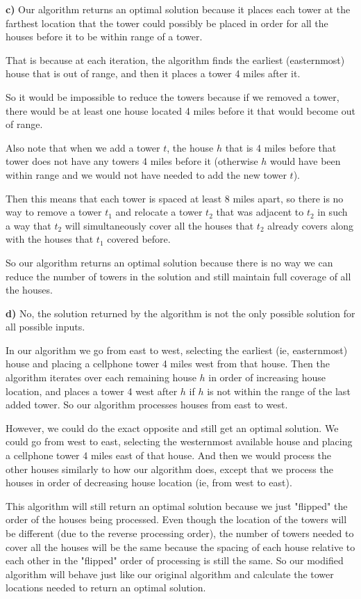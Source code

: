 \documentclass{article}
\begin{document}
\textbf{c)} Our algorithm returns an optimal solution because it places each tower at the farthest location that the tower could possibly be placed in order for all the houses before it to be within range of a tower.

That is because at each iteration, the algorithm finds the earliest (easternmost) house that is out of range, and then it places a tower 4 miles after it.

So it would be impossible to reduce the towers because if we removed a tower, there would be at least one house located 4 miles before it that would become out of range. 

Also note that when we add a tower $t$, the house $h$ that is 4 miles before that tower does not have any towers 4 miles before it (otherwise $h$ would have been within range and we would not have needed to add the new tower $t$).

Then this means that each tower is spaced at least 8 miles apart, so there is no way to remove a tower $t_1$ and relocate a tower $t_2$ that was adjacent to $t_2$ in such a way that $t_2$ will simultaneously cover all the houses that $t_2$ already covers along with the houses that $t_1$ covered before.

So our algorithm returns an optimal solution because there is no way we can reduce the number of towers in the solution and still maintain full coverage of all the houses.



\textbf{d)} No, the solution returned by the algorithm is not the only possible solution for all possible inputs.

In our algorithm we go from east to west, selecting the earliest (ie, easternmost) house and placing a cellphone tower 4 miles west from that house.
Then the algorithm iterates over each remaining house $h$ in order of increasing house location, and places a tower 4 west after $h$ if $h$ is not within the range of the last added tower. So our algorithm processes houses from east to west.

However, we could do the exact opposite and still get an optimal solution. We could go from west to east, selecting the westernmost available house and placing a cellphone tower 4 miles east of that house. And then we would process the other houses similarly to how our algorithm does, except that we process the houses in order of decreasing house location (ie, from west to east).

This algorithm will still return an optimal solution because we just "flipped" the order of the houses being processed. Even though the location of the towers will be different (due to the reverse processing order), the number of towers needed to cover all the houses will be the same because the spacing of each house relative to each other in the "flipped" order of processing is still the same. So our modified algorithm will behave just like our original algorithm and calculate the tower locations needed to return an optimal solution.
\end{document}
